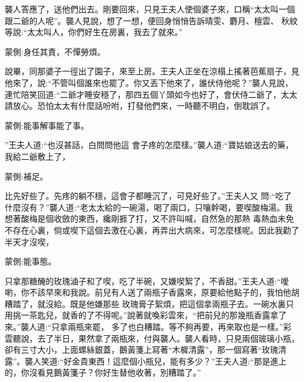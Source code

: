 \begin{parag}
    襲人答應了，送他們出去。剛要回來，只見王夫人使個婆子來，口稱“太太叫一個跟二爺的人呢”。襲人見說，想了一想，便回身悄悄告訴晴雯、麝月、檀雲、 秋紋等說:“太太叫人，你們好生在房裏，我去了就來。”\begin{note}蒙側:身任其責，不憚勞煩。\end{note}說畢，同那婆子一徑出了園子，來至上房。王夫人正坐在涼榻上搖著芭蕉扇子，見他來了，說:“不管叫個誰來也罷了。你又丟下他來了，誰伏侍他呢？”襲人見說，連忙陪笑回道:“二爺才睡安穩了，那四五個丫頭如今也好了，會伏侍二爺了，太太請放心。恐怕太太有什麼話吩咐，打發他們來，一時聽不明白，倒耽誤了。\begin{note}蒙側:能事解事能了事。\end{note}”王夫人道:“也沒甚話，白問問他這 會子疼的怎麼樣。”襲人道:“寶姑娘送去的藥，我給二爺敷上了，\begin{note}蒙側:補足。\end{note}比先好些了。先疼的躺不穩，這會子都睡沉了，可見好些了。”王夫人又 問:“吃了什麼沒有？”襲人道:“老太太給的一碗湯，喝了兩口，只嚷幹喝，要喫酸梅湯。我想著酸梅是個收斂的東西，纔剛捱了打，又不許叫喊，自然急的那熱 毒熱血未免不存在心裏，倘或喫下這個去激在心裏，再弄出大病來，可怎麼樣呢。因此我勸了半天才沒喫，\begin{note}蒙側:能事態。\end{note}只拿那糖醃的玫瑰滷子和了喫，吃了半碗，又嫌喫絮了，不香甜。”王夫人道:“噯喲，你不該早來和我說。前兒有人送了兩瓶子香露來，原要給他點子的，我怕他胡糟踏了，就沒給。既是他嫌那些 玫瑰膏子絮煩，把這個拿兩瓶子去。一碗水裏只用挑一茶匙兒，就香的了不得呢。”說著就喚彩雲來，“把前兒的那幾瓶香露拿了來。”襲人道:“只拿兩瓶來罷， 多了也白糟踏。等不夠再要，再來取也是一樣。”彩雲聽說，去了半日，果然拿了兩瓶來，付與襲人。襲人看時，只見兩個玻璃小瓶，卻有三寸大小，上面螺絲銀蓋，鵝黃箋上寫著“木樨清露”，那一個寫著“玫瑰清露”。襲人笑道:“好金貴東西！這麼個小瓶兒，能有多少？”王夫人道:“那是進上的，你沒看見鵝黃箋子？你好生替他收著，別糟踏了。”
\end{parag}


